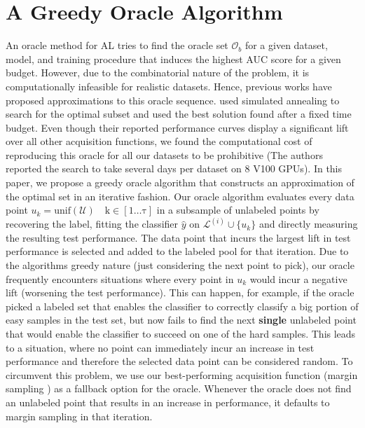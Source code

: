 \documentclass[]{article}
\begin{document}
\section{A Greedy Oracle Algorithm}\label{sec:oracle}
An oracle method for AL tries to find the oracle set $\mathcal{O}_b$ for a given dataset, model, and training procedure that induces the highest AUC score for a given budget.
However, due to the combinatorial nature of the problem, it is computationally infeasible for realistic datasets.
Hence, previous works have proposed approximations to this oracle sequence. 
\cite{zhou2021towards} used simulated annealing to search for the optimal subset and used the best  solution found after a fixed time budget. 
Even though their reported performance curves display a significant lift over all other acquisition functions, we found the computational cost of reproducing this oracle for all our datasets to be prohibitive (The authors reported the search to take several days per dataset on 8 V100 GPUs).
In this paper, we propose a greedy oracle algorithm that constructs an approximation of the optimal set in an iterative fashion.
Our oracle algorithm evaluates every data point $u_k = \operatorname{unif(\mathcal{U}) \quad k \in [1 \ldots \tau]}$ in a subsample of unlabeled points by recovering the label, fitting the classifier $\hat y$ on $\mathcal{L}^{(i)} \cup \{u_k\}$ and directly measuring the resulting test performance.
The data point that incurs the largest lift in test performance is selected and added to the labeled pool for that iteration.
Due to the algorithms greedy nature (just considering the next point to pick), our oracle frequently encounters situations where every point in $u_k$ would incur a negative lift (worsening the test performance).
This can happen, for example, if the oracle picked a labeled set that enables the classifier to correctly classify a big portion of easy samples in the test set, but now fails to find the next \textbf{single} unlabeled point that would enable the classifier to succeed on one of the hard samples.
This leads to a situation, where no point can immediately incur an increase in test performance and therefore the selected data point can be considered random.
To circumvent this problem, we use our best-performing acquisition function (margin sampling \cite{wang2014new}) as a fallback option for the oracle.
Whenever the oracle does not find an unlabeled point that results in an increase in performance, it defaults to margin sampling in that iteration.
\end{document}
